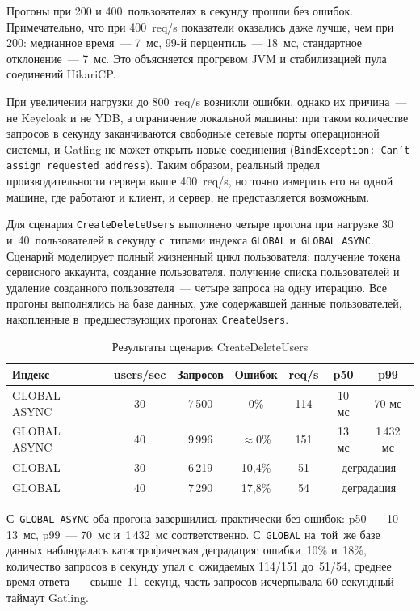 \documentclass[times]{itmo-student-thesis}
\begin{document}
Прогоны при 200 и 400~пользователях в секунду прошли без ошибок.
Примечательно, что при 400~req/s показатели оказались даже лучше, чем при 200:
медианное время~--- 7~мс, 99-й перцентиль~--- 18~мс, стандартное отклонение~---
7~мс. Это объясняется прогревом JVM и стабилизацией пула соединений HikariCP.

При увеличении нагрузки до 800~req/s возникли ошибки, однако их причина~---
не Keycloak и не YDB, а ограничение
локальной машины: при таком количестве запросов в секунду заканчиваются
свободные сетевые порты операционной системы, и Gatling не может открыть
новые соединения (\texttt{BindException: Can't assign requested address}).
Таким образом, реальный предел производительности сервера выше 400~req/s,
но точно измерить его на одной машине, где работают и клиент, и сервер,
не представляется возможным.

Для сценария \texttt{CreateDeleteUsers} выполнено четыре прогона при нагрузке
30 и~40~пользователей в секунду с~типами индекса \texttt{GLOBAL} и~\texttt{GLOBAL ASYNC}.
Сценарий моделирует полный жизненный цикл пользователя: получение токена
сервисного аккаунта, создание пользователя, получение списка пользователей
и удаление созданного пользователя~--- четыре запроса на одну итерацию.
Все прогоны выполнялись на базе данных, уже содержавшей данные пользователей,
накопленные в~предшествующих прогонах \texttt{CreateUsers}.

\begin{table}[H]
\centering
\begin{tabular}{|l|c|c|c|c|c|c|}
\hline
\textbf{Индекс} & \textbf{users/sec} & \textbf{Запросов} & \textbf{Ошибок} & \textbf{req/s} & \textbf{p50} & \textbf{p99} \\
\hline
GLOBAL ASYNC & 30 & 7\,500  & 0\%          & 114 & 10 мс  & 70 мс     \\
GLOBAL ASYNC & 40 & 9\,996  & $\approx$0\% & 151 & 13 мс  & 1\,432 мс \\
GLOBAL       & 30 & 6\,219  & 10{,}4\%     & 51  & \multicolumn{2}{c|}{деградация} \\
GLOBAL       & 40 & 7\,290  & 17{,}8\%     & 54  & \multicolumn{2}{c|}{деградация} \\
\hline
\end{tabular}
\caption{Результаты сценария CreateDeleteUsers}
\label{tab:load-create-delete-users}
\end{table}

С~\texttt{GLOBAL ASYNC} оба прогона завершились практически без ошибок:
p50~--- 10–13~мс, p99~--- 70~мс и~1\,432~мс соответственно.
С~\texttt{GLOBAL} на~той~же базе данных наблюдалась катастрофическая деградация:
ошибки~10\% и~18\%, количество запросов в секунду упал с~ожидаемых 114/151 до~51/54,
среднее время ответа~--- свыше~11~секунд,
часть запросов исчерпывала 60-секундный таймаут Gatling.
\end{document}
